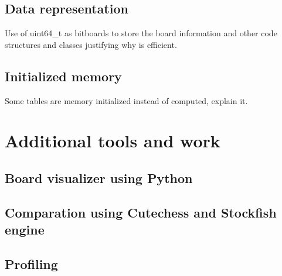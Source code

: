 \subsection{Data representation}

Use of uint64\_t as bitboards to store the board information and other code structures and classes justifying why is efficient.

\subsection{Initialized memory}

Some tables are memory initialized instead of computed, explain it.

\section{Additional tools and work}

\subsection{Board visualizer using Python}

\subsection{Comparation using Cutechess and Stockfish engine}

\subsection{Profiling}

